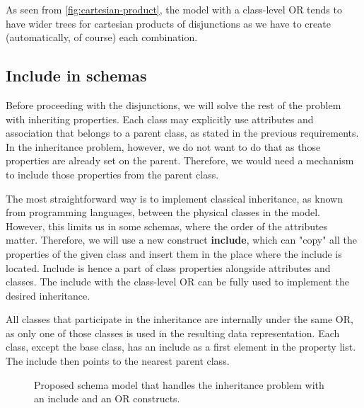 As seen from \autoref{fig:cartesian-product}, the model with a class-level OR tends to have wider trees for cartesian products of disjunctions as we have to create (automatically, of course) each combination.

\subsection*{Include in schemas}

Before proceeding with the disjunctions, we will solve the rest of the problem with inheriting properties. Each class may explicitly use attributes and association that belongs to a parent class, as stated in the previous requirements. In the inheritance problem, however, we do not want to do that as those properties are already set on the parent. Therefore, we would need a mechanism to include those properties from the parent class.

The most straightforward way is to implement classical inheritance, as known from programming languages, between the physical classes in the model. However, this limits us in some schemas, where the order of the attributes matter. Therefore, we will use a new construct \textbf{include}, which can "copy" all the properties of the given class and insert them in the place where the include is located. Include is hence a part of class properties alongside attributes and classes. The include with the class-level OR can be fully used to implement the desired inheritance.

All classes that participate in the inheritance are internally under the same OR, as only one of those classes is used in the resulting data representation. Each class, except the base class, has an include as a first element in the property list. The include then points to the nearest parent class.

\begin{figure}[h!]\centering
  \centering

    \caption{Proposed schema model that handles the inheritance problem with an include and an OR constructs.}
  \end{figure}

